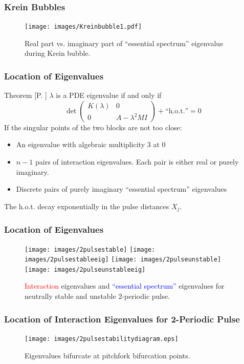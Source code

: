 \documentclass[16pt]{beamer}
\begin{document}
\begin{frame}
	\frametitle{Krein Bubbles}
	\fontsize{16}{7.2}\selectfont
		\begin{figure}
		\begin{center}
		\texttt{[image: images/Kreinbubble1.pdf]}
		\end{center}
		\caption{Real part vs. imaginary part of ``essential spectrum'' eigenvalue during Krein bubble.}
		\end{figure}
\end{frame}

\begin{frame}
\frametitle{Location of Eigenvalues} 
	\fontsize{14}{7.2}\selectfont
    \begin{block}{Theorem [P. ]}
    $\lambda$ is a PDE eigenvalue if and only if 
    \[
    \det\begin{pmatrix}K(\lambda) & 0 \\ 0 & A - \lambda^2  M I \end{pmatrix} + \text{``h.o.t.''} = 0
    \]
    If the singular points of the two blocks are not too close:
    \begin{itemize}
    	\item An eigenvalue with algebraic multiplicity 3 at 0
    	\item $n-1$ pairs of interaction eigenvalues. Each pair is either real or purely imaginary.
    	\item Discrete pairs of purely imaginary ``essential spectrum'' eigenvalues
    \end{itemize}
    The h.o.t. decay exponentially in the pulse distances $X_j$.
    \end{block}
\end{frame}

\begin{frame}
	\frametitle{Location of Eigenvalues}
	\fontsize{16}{7.2}\selectfont
		\begin{figure}
		\begin{center}
		\texttt{[image: images/2pulsestable]}
		\texttt{[image: images/2pulsestableeig]}
		\texttt{[image: images/2pulseunstable]}
		\texttt{[image: images/2pulseunstableeig]}
		\end{center}
		\caption{\textcolor{red}{Interaction} eigenvalues and \textcolor{blue}{``essential spectrum''} eigenvalues for neutrally stable and unstable 2-periodic pulse.}
		\end{figure}
\end{frame}

\begin{frame}
	\frametitle{Location of Interaction Eigenvalues for 2-Periodic Pulse}
	\fontsize{16}{7.2}\selectfont
		\begin{figure}
		\begin{center}
		\texttt{[image: images/2pulsestabilitydiagram.eps]}
		\end{center}
		\caption{Eigenvalues bifurcate at pitchfork bifurcation points.}
		\end{figure}
\end{frame}
\end{document}

